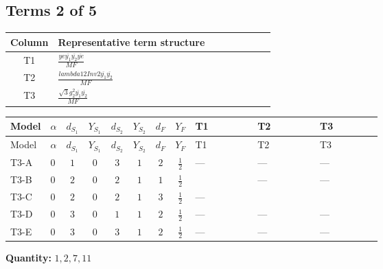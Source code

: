 \documentclass[8pt]{article}
\begin{document}
\begin{landscape}
\subsection*{Terms 2 of 5}
\begin{center}
\begin{tabular}{@{}c >{\raggedright\arraybackslash}p{0.82\linewidth}@{}}
\toprule
Column & Representative term structure \\
\midrule
T1 & \(\displaystyle \frac{ye \overline{y_{1}} \overline{y_{2}} \overline{ye}}{MF}\) \\
\midrule
T2 & \(\displaystyle \frac{lambda12Inv2 \overline{y_{1}} \overline{y_{2}}}{MF}\) \\
\midrule
T3 & \(\displaystyle \frac{\sqrt{3} g_{2}^{2} \overline{y_{1}} \overline{y_{2}}}{MF}\) \\
\midrule
\bottomrule
\end{tabular}
\end{center}
\smallskip
\tiny
\begin{longtable}{@{}llcccccc >{\raggedright\arraybackslash}p{0.21\linewidth} >{\raggedright\arraybackslash}p{0.21\linewidth} >{\raggedright\arraybackslash}p{0.21\linewidth}@{}}
\toprule
Model & $\alpha$ & $d_{S_1}$ & $Y_{S_1}$ & $d_{S_2}$ & $Y_{S_2}$ & $d_F$ & $Y_F$ & T1 & T2 & T3 \\
\midrule
\endfirsthead
\toprule
Model & $\alpha$ & $d_{S_1}$ & $Y_{S_1}$ & $d_{S_2}$ & $Y_{S_2}$ & $d_F$ & $Y_F$ & T1 & T2 & T3 \\
\midrule
\endhead
T3-A & $0$ & $1$ & $0$ & $3$ & $1$ & $2$ & $\frac{1}{2}$ & --- & --- & --- \\
\midrule
T3-B & $0$ & $2$ & $0$ & $2$ & $1$ & $1$ & $\frac{1}{2}$ & \scriptsize\adjustbox{max width=\linewidth}{$\begin{gathered} \frac{ye \overline{y_{1}} \overline{y_{2}} \overline{ye}}{8 MF}\end{gathered}$} & --- & --- \\
\midrule
T3-C & $0$ & $2$ & $0$ & $2$ & $1$ & $3$ & $\frac{1}{2}$ & --- & \scriptsize\adjustbox{max width=\linewidth}{$\begin{gathered} \frac{lambda12Inv2 \overline{y_{1}} \overline{y_{2}}}{6 MF}\end{gathered}$} & \scriptsize\adjustbox{max width=\linewidth}{$\begin{gathered} \frac{\sqrt{3} g_{2}^{2} \overline{y_{1}} \overline{y_{2}}}{8 MF}\end{gathered}$} \\
\midrule
T3-D & $0$ & $3$ & $0$ & $1$ & $1$ & $2$ & $\frac{1}{2}$ & --- & --- & --- \\
\midrule
T3-E & $0$ & $3$ & $0$ & $3$ & $1$ & $2$ & $\frac{1}{2}$ & --- & --- & --- \\
\midrule
\bottomrule
\end{longtable}
\clearpage
\noindent\textbf{Quantity: }$\mathrm{1,2,7,11}$\par\smallskip

\end{landscape}
\end{document}
